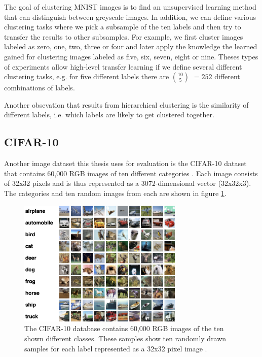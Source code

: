 The goal of clustering MNIST images is to find an unsupervised learning method that can distinguish between greyscale images. In addition, we can define various clustering tasks where we pick a subsample of the ten labels and then try to transfer the results to other subsamples. For example, we first cluster images labeled as zero, one, two, three or four and later apply the knowledge the learned gained for clustering images labeled as five, six, seven, eight or nine. Theses types of experiments allow high-level transfer learning if we define several different clustering tasks, e.g. for five different labels there are $10 \choose 5$ $= 252$ different combinations of labels.

Another obsevation that results from hierarchical clustering is the similarity of different labels, i.e. which labels are likely to get clustered together.

\subsection{CIFAR-10}

Another image dataset this thesis uses for evaluation is the CIFAR-10 dataset that contains 60,000 RGB images of ten different categories \cite{Krizhevsky2009LearningML}. Each image consists of 32x32 pixels and is thus represented as a 3072-dimensional vector (32x32x3). The categories and ten random images from each are shown in figure \ref{fig:cifar10}.

\begin{figure}[h]
    \centering
    \includegraphics[width=0.7\textwidth]{images/cifar10}
    \caption{The CIFAR-10  database contains 60,000 RGB images of the ten shown different classes. These samples show ten randomly drawn samples for each label represented as a 32x32 pixel image \cite{Krizhevsky2009LearningML}.}
    \label{fig:cifar10}
\end{figure}

